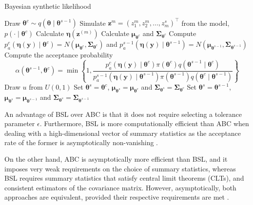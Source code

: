 \begin{algorithm}
	\caption{Bayesian synthetic likelihood}\label{BSL0}
	\begin{algorithmic}[1]
			\State Draw $\boldsymbol{\theta}^c\sim q(\boldsymbol{\theta}\mid \boldsymbol{\theta}^{s-1})$
				\State Simulate ${\boldsymbol z}^{m}=(z_{1}^{m},z_{2}^{m},...,z_{m}^{s})^{\top}$ from the model, $p(\cdot\mid{\boldsymbol{\theta} }^c)$
				\State Calculate $\boldsymbol{\eta}(\boldsymbol{z}^{(m)})$
			\EndFor 			 
			\State Calculate $\boldsymbol{\mu}_{\boldsymbol{\theta}^c}$ and $\boldsymbol{\Sigma}_{\boldsymbol{\theta}^c}$
			\State Compute $p_a^c(\boldsymbol{\eta}(\boldsymbol{y})\mid \boldsymbol{\theta}^c) = N(\boldsymbol{\mu}_{\boldsymbol{\theta}^c}, \boldsymbol{\Sigma}_{\boldsymbol{\theta}^c})$ and $p_a^{s-1}(\boldsymbol{\eta}(\boldsymbol{y})\mid \boldsymbol{\theta}^{s-1}) = N(\boldsymbol{\mu}_{\boldsymbol{\theta}^{s-1}}, \boldsymbol{\Sigma}_{\boldsymbol{\theta}^{s-1}})$
			\State Compute the acceptance probability
			$$\alpha(\boldsymbol{\theta}^{s-1},\boldsymbol{\theta}^c)=\min\left\{1,\frac{p_a^c(\boldsymbol{\eta}(\boldsymbol{y})\mid \boldsymbol{\theta}^c)\pi(\boldsymbol{\theta}^c)q(\boldsymbol{\theta}^{s-1}\mid \boldsymbol{\theta}^{c})}{p_a^{s-1}(\boldsymbol{\eta}(\boldsymbol{y})\mid \boldsymbol{\theta}^{s-1})\pi(\boldsymbol{\theta}^{s-1})q(\boldsymbol{\theta}^{c}\mid \boldsymbol{\theta}^{s-1})}\right\}$$
			\State Draw $u$ from $U(0,1)$
				\State Set $\boldsymbol{\theta}^{s}=\boldsymbol{\theta}^{c}$, $\boldsymbol{\mu}_{\boldsymbol{\theta}^{s}}=\boldsymbol{\mu}_{\boldsymbol{\theta}^c}$ and $\boldsymbol{\Sigma}_{\boldsymbol{\theta}^s}=\boldsymbol{\Sigma}_{\boldsymbol{\theta}^c}$
			\Else
				\State Set $\boldsymbol{\theta}^{s}=\boldsymbol{\theta}^{s-1}$, $\boldsymbol{\mu}_{\boldsymbol{\theta}^{s}}=\boldsymbol{\mu}_{\boldsymbol{\theta}^{s-1}}$ and $\boldsymbol{\Sigma}_{\boldsymbol{\theta}^s}=\boldsymbol{\Sigma}_{\boldsymbol{\theta}^{s-1}}$
			\EndIf  
		\EndFor
	\end{algorithmic}
\end{algorithm}

An advantage of BSL over ABC is that it does not require selecting a tolerance parameter $\epsilon$. Furthermore, BSL is more computationally efficient than ABC when dealing with a high-dimensional vector of summary statistics as the acceptance rate of the former is asymptotically non-vanishing \cite{nott2023bayesian}.  

On the other hand, ABC is asymptotically more efficient than BSL, and it imposes very weak requirements on the choice of summary statistics, whereas BSL requires summary statistics that satisfy central limit theorems (CLTs), and consistent estimators of the covariance matrix. However, asymptotically, both approaches are equivalent, provided their respective requirements are met \cite{martin2024approximating}.  

